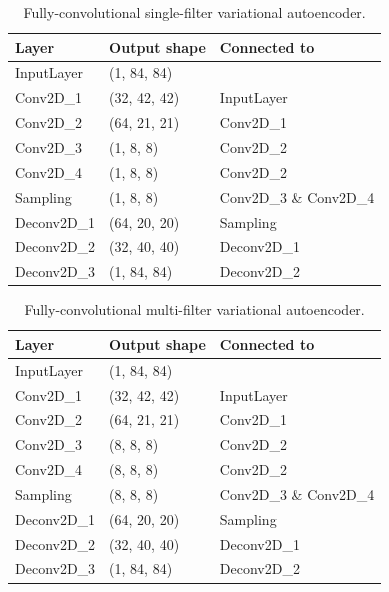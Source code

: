 \begin{table}[]
\centering
\begin{tabular}{@{}lll@{}}
\toprule
\textbf{Layer} & \textbf{Output shape} & \textbf{Connected to}  \\ \midrule
InputLayer     & (1, 84, 84)           &                        \\
Conv2D\_1      & (32, 42, 42)          & InputLayer             \\
Conv2D\_2      & (64, 21, 21)          & Conv2D\_1              \\
Conv2D\_3      & (1, 8, 8)             & Conv2D\_2              \\
Conv2D\_4      & (1, 8, 8)             & Conv2D\_2              \\
Sampling       & (1, 8, 8)             & Conv2D\_3 \& Conv2D\_4 \\
Deconv2D\_1    & (64, 20, 20)          & Sampling               \\
Deconv2D\_2    & (32, 40, 40)          & Deconv2D\_1            \\
Deconv2D\_3    & (1, 84, 84)           & Deconv2D\_2           
\end{tabular}
\caption{Fully-convolutional single-filter variational autoencoder.}
\label{tab:fully_convolutional_single_filter}
\end{table}


\begin{table}[]
\centering
\begin{tabular}{@{}lll@{}}
\toprule
\textbf{Layer} & \textbf{Output shape} & \textbf{Connected to}  \\ \midrule
InputLayer     & (1, 84, 84)           &                        \\
Conv2D\_1      & (32, 42, 42)          & InputLayer             \\
Conv2D\_2      & (64, 21, 21)          & Conv2D\_1              \\
Conv2D\_3      & (8, 8, 8)             & Conv2D\_2              \\
Conv2D\_4      & (8, 8, 8)             & Conv2D\_2              \\
Sampling       & (8, 8, 8)             & Conv2D\_3 \& Conv2D\_4 \\
Deconv2D\_1    & (64, 20, 20)          & Sampling               \\
Deconv2D\_2    & (32, 40, 40)          & Deconv2D\_1            \\
Deconv2D\_3    & (1, 84, 84)           & Deconv2D\_2           
\end{tabular}
\caption{Fully-convolutional multi-filter variational autoencoder.}
\label{tab:fully_convolutional_multiple_filter}
\end{table}


